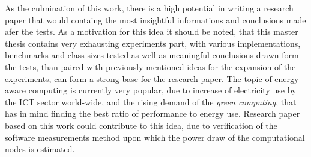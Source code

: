 As the culmination of this work, there is a high potential in writing
a research paper that would containg the most insightful informations
and conclusions made afer the tests. As a motivation for this idea it should
be noted, that this master thesis contains very exhausting experiments part,
with various implementations, benchmarks and class sizes tested as well as
meaningful conclusions drawn form the tests, than paired with previously
mentioned ideas for the expansion of the experiments, can form a strong base
for the research paper. The topic of energy aware computing is currently
very popular, due to increase of electricity use by the ICT sector world-wide,
and the rising demand of the \emph{green computing}, that has in mind finding
the best ratio of performance to energy use. Research paper based on this work
could contribute to this idea, due to verification of the software measurements
method upon which the power draw of the computational nodes is estimated.